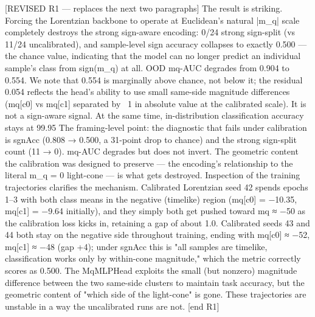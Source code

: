 [REVISED R1 — replaces the next two paragraphs]
The result is striking. Forcing the Lorentzian backbone to operate at Euclidean's natural |m_q| scale completely destroys the strong sign-aware encoding: 0/24 strong sign-split (vs 11/24 uncalibrated), and sample-level sign accuracy collapses to exactly 0.500 — the chance value, indicating that the model can no longer predict an individual sample's class from sign(m_q) at all. OOD mq-AUC degrades from 0.904 to 0.554. We note that 0.554 is marginally above chance, not below it; the residual 0.054 reflects the head's ability to use small same-side magnitude differences (mq[c0] vs mq[c1] separated by ~1 in absolute value at the calibrated scale). It is not a sign-aware signal. At the same time, in-distribution classification accuracy stays at 99.95%
The framing-level point: the diagnostic that fails under calibration is sgnAcc (0.808 → 0.500, a 31-point drop to chance) and the strong sign-split count (11 → 0). mq-AUC degrades but does not invert. The geometric content the calibration was designed to preserve — the encoding's relationship to the literal m_q = 0 light-cone — is what gets destroyed.
Inspection of the training trajectories clarifies the mechanism. Calibrated Lorentzian seed 42 spends epochs 1–3 with both class means in the negative (timelike) region (mq[c0] = −10.35, mq[c1] = −9.64 initially), and they simply both get pushed toward mq ≈ −50 as the calibration loss kicks in, retaining a gap of about 1.0. Calibrated seeds 43 and 44 both stay on the negative side throughout training, ending with mq[c0] ≈ −52, mq[c1] ≈ −48 (gap +4); under sgnAcc this is "all samples are timelike, classification works only by within-cone magnitude," which the metric correctly scores as 0.500. The MqMLPHead exploits the small (but nonzero) magnitude difference between the two same-side clusters to maintain task accuracy, but the geometric content of "which side of the light-cone" is gone. These trajectories are unstable in a way the uncalibrated runs are not.
[end R1]

